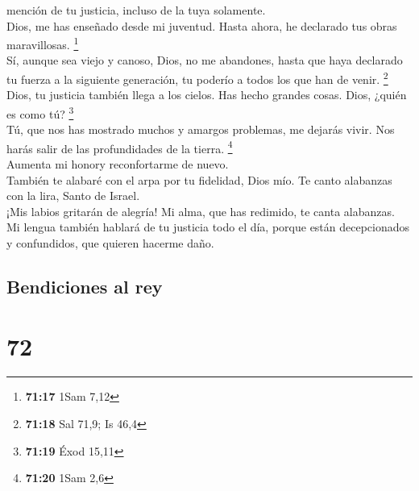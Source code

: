 mención de tu justicia, incluso de la tuya solamente.\\
 Dios, me has enseñado desde mi juventud. Hasta ahora, he
declarado tus obras maravillosas. \footnote{\textbf{71:17} 1Sam 7,12}\\
 Sí, aunque sea viejo y canoso, Dios, no me abandones,
hasta que haya declarado tu fuerza a la siguiente generación, tu poderío
a todos los que han de venir. \footnote{\textbf{71:18} Sal 71,9; Is 46,4}\\
 Dios, tu justicia también llega a los cielos. Has hecho
grandes cosas. Dios, ¿quién es como tú? \footnote{\textbf{71:19} Éxod
  15,11}\\
 Tú, que nos has mostrado muchos y amargos problemas, me
dejarás vivir. Nos harás salir de las profundidades de la tierra.
\footnote{\textbf{71:20} 1Sam 2,6}\\
 Aumenta mi honory reconfortarme de nuevo.\\
 También te alabaré con el arpa por tu fidelidad, Dios
mío. Te canto alabanzas con la lira, Santo de Israel.\\
 ¡Mis labios gritarán de alegría! Mi alma, que has
redimido, te canta alabanzas.\\
 Mi lengua también hablará de tu justicia todo el día,
porque están decepcionados y confundidos, que quieren hacerme daño.

\hypertarget{bendiciones-al-rey}{%
\subsection{Bendiciones al rey}\label{bendiciones-al-rey}}

\hypertarget{section-70}{%
\section{72}\label{section-70}}

